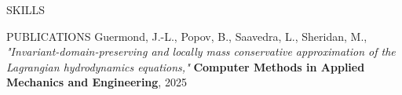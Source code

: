 \documentclass{resume} %
\begin{document}
\begin{rSection}{SKILLS}
    \skills
\end{rSection}

\begin{rSection}{PUBLICATIONS}
Guermond, J.-L., Popov, B., Saavedra, L., Sheridan, M., \textit{"Invariant-domain-preserving and locally mass conservative approximation of the Lagrangian hydrodynamics equations,"} \textbf{Computer Methods in Applied Mechanics and Engineering}, 2025
\end{rSection}
\end{document}
